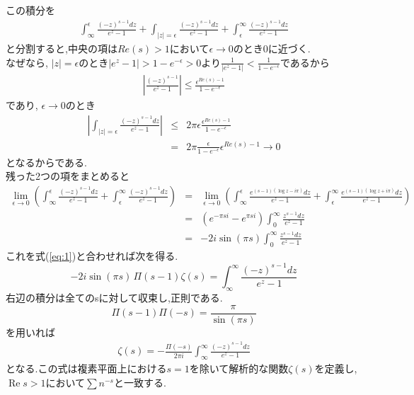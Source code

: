 この積分を
\begin{align}
\int_{\infty}^\epsilon \frac{(-z)^{s-1}dz}{e^z-1}+\int_{|z|=\epsilon} \frac{(-z)^{s-1}dz}{e^z-1}+\int_\epsilon^{\infty} \frac{(-z)^{s-1}dz}{e^z-1}\label{eq:2}
\end{align}
と分割すると,中央の項は$Re(s)>1$において$\epsilon\to0$のとき0に近づく.\\
なぜなら, $|z|=\epsilon$のとき$|e^z-1|>1-e^{-\epsilon}>0$より$\frac{1}{|e^z-1|}<\frac{1}{1-e^{-\epsilon}}$であるから
\begin{eqnarray*}
\left|\frac{(-z)^{s-1}}{e^z-1}\right| \le \frac{\epsilon^{Re(s)-1}}{1-e^{-\epsilon}}
\end{eqnarray*}
であり, $\epsilon\to0$のとき
\begin{eqnarray*}
\left|\int_{|z|=\epsilon} \frac{(-z)^{s-1}dz}{e^z-1}\right| &\le& 2\pi\epsilon \frac{\epsilon^{Re(s)-1}}{1-e^{-\epsilon}}\\
&=& 2\pi\frac{\epsilon}{1-e^{-\epsilon}}\epsilon^{Re(s)-1}\to0
\end{eqnarray*}
となるからである.\\
残った2つの項をまとめると
\begin{eqnarray*}
\lim_{\epsilon \to 0}\left(\int_{\infty}^\epsilon \frac{(-z)^{s-1}dz}{e^z-1}+\int_\epsilon^{\infty} \frac{(-z)^{s-1}dz}{e^z-1}\right) &=& \lim_{\epsilon \to 0}\left(\int_{\infty}^\epsilon \frac{e^{(s-1)(\log z-i\pi)}dz}{e^z-1}+\int_\epsilon^{\infty} \frac{e^{(s-1)(\log z+i\pi)}dz}{e^z-1}\right)\\
&=& (e^{-\pi si}-e^{\pi si}) \int_0^\infty \frac{z^{s-1}dz}{e^z-1}\\
&=& -2i\sin{(\pi s)}\int_0^\infty \frac{z^{s-1}dz}{e^z-1}
\end{eqnarray*}
これを式(\ref{eq:1})と合わせれば次を得る.
\[
-2i\sin{(\pi s)}\,\Pi(s-1)\zeta(s)=\int_\infty^\infty \frac{(-z)^{s-1}dz}{e^z-1}
\]
右辺の積分は全てのsに対して収束し,正則である.\\
\[
\Pi(s-1)\Pi(-s)=\frac{\pi}{\sin{(\pi s)}}
\]
を用いれば
\begin{align}
\zeta(s)=-\frac{\Pi(-s)}{2\pi i}\int_{\infty}^{\infty} \frac{(-z)^{s-1}dz}{e^z-1}\label{eq:3}
\end{align}
となる.この式は複素平面上における$s=1$を除いて解析的な関数$\zeta(s)$を定義し, $\operatorname{Re} s>1$において$\sum n^{-s}$と一致する.\\

